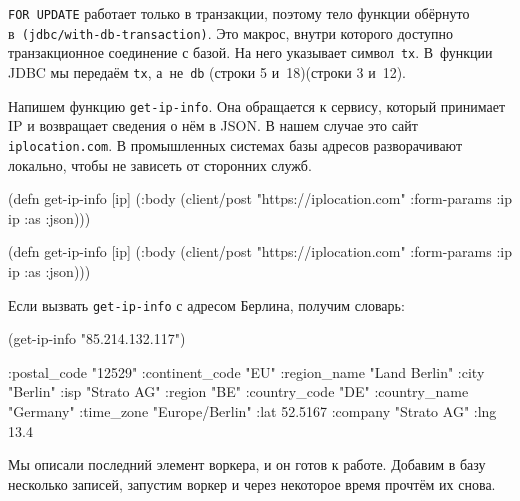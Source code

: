 \fi

\verb|FOR UPDATE| работает только в транзакции, поэтому тело функции обёрнуто
в~\texttt{(jdbc/with\--db-transaction)}. Это макрос, внутри которого доступно
транзакционное соединение с базой. На него указывает символ~\verb|tx|. В~функции
JDBC мы передаём \verb|tx|, а~не~\verb|db| \ifx\DEVICETYPE\MOBILE(строки 5 и~18)\else(строки 3 и~12)\fi.


Напишем функцию \verb|get-ip-info|. Она обращается к сервису, который принимает
IP и возвращает сведения о нём в JSON. В нашем случае это сайт
\verb|iplocation.com|. В промышленных системах базы адресов разворачивают
локально, чтобы не зависеть от сторонних служб.

\ifx\DEVICETYPE\MOBILE

\begin{english}
  \begin{clojure}
(defn get-ip-info [ip]
  (:body (client/post
           "https://iplocation.com"
           {:form-params {:ip ip}
            :as :json})))
  \end{clojure}
\end{english}

\else

\begin{english}
  \begin{clojure}
(defn get-ip-info [ip]
  (:body (client/post "https://iplocation.com"
                      {:form-params {:ip ip}
                       :as :json})))
  \end{clojure}
\end{english}

\fi

\noindent
Если вызвать \verb|get-ip-info| с адресом Берлина, получим словарь:

\begin{english}
  \begin{clojure}
(get-ip-info "85.214.132.117")

{:postal_code "12529"
 :continent_code "EU"
 :region_name "Land Berlin"
 :city "Berlin"
 :isp "Strato AG"
 :region "BE"
 :country_code "DE"
 :country_name "Germany"
 :time_zone "Europe/Berlin"
 :lat 52.5167
 :company "Strato AG"
 :lng 13.4}
  \end{clojure}
\end{english}

Мы описали последний элемент воркера, и он готов к работе. Добавим в базу
несколько записей, запустим воркер и через некоторое время прочтём их снова.

